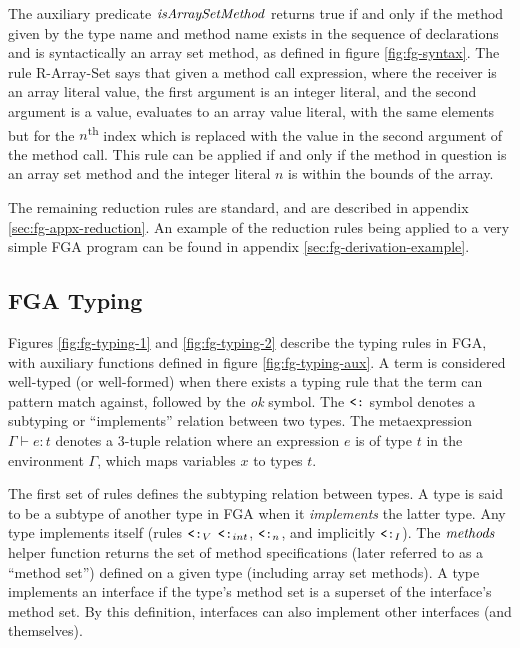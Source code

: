 The auxiliary predicate $\mathit{isArraySetMethod}$ returns true if and only if the
method given by the type name and method name exists in the sequence of
declarations and is syntactically an array set method, as defined in figure
\ref{fig:fg-syntax}. The rule R-Array-Set says that given a method call
expression, where the receiver is an array literal value, the first argument is
an integer literal, and the second argument is a value, evaluates to an array
value literal, with the same elements but for the $n$\textsuperscript{th} index
which is replaced with the value in the second argument of the method call. This
rule can be applied if and only if the method in question is an array set method
and the integer literal $n$ is within the bounds of the array.

The remaining reduction rules are standard, and are described in
appendix \ref{sec:fg-appx-reduction}. An example of the reduction
rules being applied to a very simple FGA program can be found in appendix
\ref{sec:fg-derivation-example}.



\subsection{FGA Typing}

Figures \ref{fig:fg-typing-1} and \ref{fig:fg-typing-2} describe the typing
rules in FGA, with auxiliary functions defined in figure
\ref{fig:fg-typing-aux}. A term is considered well-typed (or well-formed) when
there exists a typing rule that the term can pattern match against, followed by
the \emph{ok} symbol. The $\mathbin{\texttt{<:}}$ symbol denotes a subtyping or ``implements''
relation between two types. The metaexpression $\Gamma \vdash e : t$ denotes a
3-tuple relation where an expression $e$ is of type $t$ in the environment
$\Gamma$, which maps variables $x$ to types $t$.

The first set of rules defines the subtyping relation between types. A type is
said to be a subtype of another type in FGA when it \emph{implements} the latter
type. Any type implements itself (rules $\mathbin{\texttt{<:}}_V$ $\mathbin{\texttt{<:}}_{int}$, $\mathbin{\texttt{<:}}_n$, and
implicitly $\mathbin{\texttt{<:}}_I$). The $\mathit{methods}$ helper function returns the set of method
specifications (later referred to as a ``method set'') defined on a given type
(including array set methods). A type implements an interface if the type's
method set is a superset of the interface's method set. By this definition,
interfaces can also implement other interfaces (and themselves).

